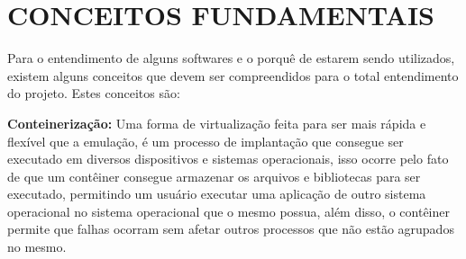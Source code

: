 \chapter{CONCEITOS FUNDAMENTAIS} \label{conceitos}

Para o entendimento de alguns softwares e o porquê de estarem sendo utilizados, existem alguns conceitos que devem ser compreendidos para o total entendimento do projeto. Estes conceitos são:

\textbf{Conteinerização:} Uma forma de virtualização feita para ser mais rápida e flexível que a emulação, é um processo de implantação que consegue ser executado em diversos dispositivos e sistemas operacionais, isso ocorre pelo fato de que um contêiner consegue armazenar os arquivos e bibliotecas para ser executado, permitindo um usuário executar uma aplicação de outro sistema operacional no sistema operacional que o mesmo possua, além disso, o contêiner permite que falhas ocorram sem afetar outros processos que não estão agrupados no mesmo. \cite{Wen2023}

